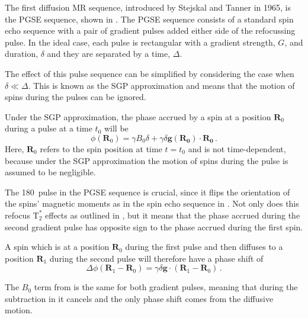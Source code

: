 The first diffusion MR sequence, introduced by Stejskal and Tanner in 1965\cite{Stejskal1965}, is the \ac{PGSE} sequence, shown in .
The PGSE sequence consists of a standard spin echo sequence with a pair of gradient pulses added either side of the refocussing pulse.
In the ideal case, each pulse is rectangular with a gradient strength, $G$, and duration, $\delta$ and they are separated by a time, $\Delta$.  

The effect of this pulse sequence can be simplified by considering the case when $\delta \ll \Delta$. This is known as the \ac{SGP} approximation and means that the motion of spins during the pulses can be ignored. 

Under the \ac{SGP} approximation, the phase accrued by a spin at a position $\mathbf{R}_0$ during a pulse at a time $t_0$ will be
\begin{equation}
  \phi(\mathbf{R}_0) = \gamma B_0\delta +  \gamma \delta \mathbf{g(R_0)}\cdot\mathbf{R_0}\,.
  \label{eq:phi_single_SGP}
\end{equation}
Here, $\mathbf{R}_0$ refers to the spin position at time $t=t_0$ and is not time-dependent, because under the SGP approximation the motion of spins during the pulse is assumed to be negligible. 

The 180\degree\ pulse in the \ac{PGSE} sequence is crucial, since it flips the orientation of the spins' magnetic moments as in the spin echo sequence in .
Not only does this refocus $\mathrm{T}_2^*$ effects as outlined in , but it means that the phase accrued during the second gradient pulse has opposite sign to the phase accrued during the first spin. 

A spin which is at a position $\mathbf{R}_0$ during the first pulse and then diffuses to a position $\mathbf{R}_1$ during the second pulse will therefore have a phase shift of 
\begin{equation}
  \Delta\phi(\mathbf{R}_1 - \mathbf{R}_0) = \gamma\delta\mathbf{g} \cdot \left(\mathbf{R}_1 - \mathbf{R}_0\right)\,.
  \label{eq:delta_phi}
\end{equation}

The $B_0$ term from  is the same for both gradient pulses, meaning that during the subtraction in  it cancels and the only phase shift comes from the diffusive motion.


